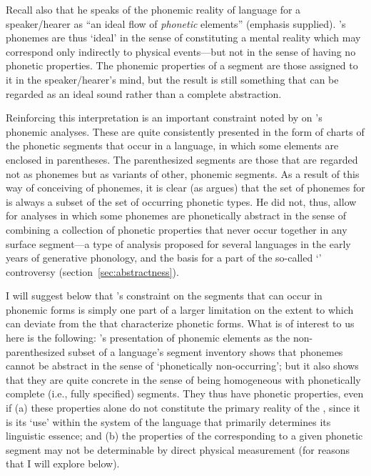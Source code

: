 Recall also that he speaks of the phonemic reality of language for a
speaker/hearer as ``an ideal flow of \emph{phonetic} elements''
(emphasis supplied). {\Sapir}'s phonemes are thus `ideal' in the sense of
constituting a mental reality which may correspond only indirectly to
physical events—but not in the sense of having no phonetic
properties. The phonemic properties of a segment are those assigned to
it in the speaker/hearer's mind, but the result is still something
that can be regarded as an ideal sound rather than a complete
abstraction.

Reinforcing this interpretation is an important constraint noted by
\citet{mccawley67:sapir} on {\Sapir}'s phonemic analyses. These are quite
consistently presented in the form of charts of the phonetic segments
that occur in a language, in which some elements are enclosed in
parentheses. The parenthesized segments are those that are regarded
not as phonemes but as variants of other, phonemic segments. As a
result of this way of conceiving of phonemes, it is clear (as {\McCawley}
argues) that the set of phonemes for {\Sapir} is always a subset of the
set of occurring phonetic types. He did not, thus, allow for analyses
in which some phonemes are phonetically abstract in the sense of
combining a collection of phonetic properties that never occur
together in any surface segment—a type of analysis proposed for
several languages in the early years of generative phonology, and the
basis for a part of the so-called `' controversy
(section~\ref{sec:abstractness}).

I will suggest below that {\Sapir}'s constraint on the segments that can
occur in phonemic forms is simply one part of a larger limitation on
the extent to which  can deviate from the
 that characterize phonetic forms. What is of interest to
us here is the following: {\Sapir}'s presentation of phonemic elements as
the non-parenthesized subset of a language's segment inventory shows
that phonemes cannot be abstract in the sense of `phonetically
non-occurring'; but it also shows that they are quite concrete in the
sense of being homogeneous with phonetically complete (i.e., fully
specified) segments. They thus have phonetic properties, even if (a)
these properties alone do not constitute the primary reality of the
, since it is its `use' within the system of the language that
primarily determines its linguistic essence; and (b) the properties of
the  corresponding to a given phonetic segment may not be
determinable by direct physical measurement (for reasons that I will
explore below).

